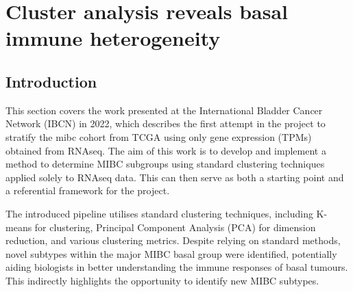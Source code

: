 \chapter{Cluster analysis reveals basal immune heterogeneity} \label{s:clustering_analysis}

\vspace{3mm}
\vspace{3mm}

\section{Introduction}

This section covers the work presented at the International Bladder Cancer Network (IBCN) in 2022, which describes the first attempt in the project to stratify the \acrfull{mibc} cohort from TCGA using only gene expression (TPMs) obtained from RNAseq. The aim of this work is to develop and implement a method to determine MIBC subgroups using standard clustering techniques applied solely to RNAseq data. This can then serve as both a starting point and a referential framework for the project.

The introduced pipeline utilises standard clustering techniques, including K-means for clustering, Principal Component Analysis (PCA) for dimension reduction, and various clustering metrics. Despite relying on standard methods, novel subtypes within the major MIBC basal group were identified, potentially aiding biologists in better understanding the immune responses of basal tumours. This indirectly highlights the opportunity to identify new MIBC subtypes.

